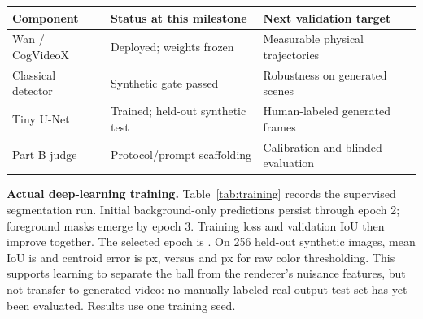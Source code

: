\documentclass[11pt,a4paper]{article}
\newcommand{\sect}[2]{\vspace{4pt}{\large\bfseries\color{navy}#1. #2}\par\vspace{2pt}}
\begin{document}
\vspace{8pt}
\begin{center}
\begin{tabular}{lll}
\toprule
\textbf{Component} & \textbf{Status at this milestone} & \textbf{Next validation target}\\
\midrule
Wan / CogVideoX & Deployed; weights frozen & Measurable physical trajectories\\
Classical detector & Synthetic gate passed & Robustness on generated scenes\\
Tiny U-Net & Trained; held-out synthetic test & Human-labeled generated frames\\
Part B judge & Protocol/prompt scaffolding & Calibration and blinded evaluation\\
\bottomrule
\end{tabular}
\end{center}

\newpage
\sect{5}{Preliminary Results}
\textbf{Actual deep-learning training.} Table~\ref{tab:training} records the
supervised segmentation run. Initial background-only predictions persist through
epoch 2; foreground masks emerge by epoch 3. Training loss and validation IoU
then improve together. The selected epoch is \BestEpoch{}. On 256 held-out
synthetic images, mean IoU is \TestIoU{} and centroid error is \TestError{} px,
versus \BaselineIoU{} and \BaselineError{} px for raw color thresholding.
This supports learning to separate the ball from the renderer's nuisance
features, but not transfer to generated video: no manually labeled real-output
test set has yet been evaluated. Results use one training seed.
\end{document}

